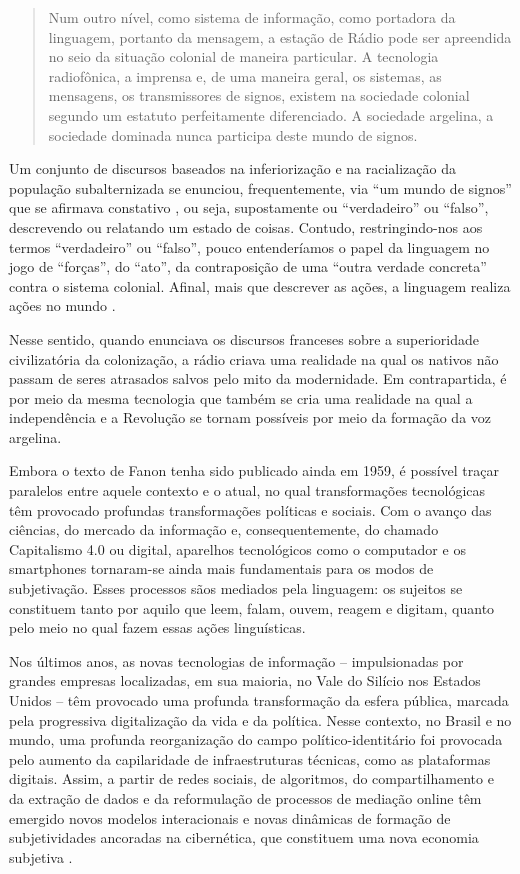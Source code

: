\documentclass[portuguese]{textolivre}
\begin{document}
\begin{quote}
    Num outro nível, como sistema de informação, como portadora da linguagem, portanto da mensagem, a estação de Rádio pode ser apreendida no seio da situação colonial de maneira particular. A tecnologia radiofônica, a imprensa e, de uma maneira geral, os sistemas, as mensagens, os transmissores de signos, existem na sociedade colonial segundo um estatuto perfeitamente diferenciado. A sociedade argelina, a sociedade dominada nunca participa deste mundo de signos.
\end{quote}

Um conjunto de discursos baseados na inferiorização e na racialização da população subalternizada se enunciou, frequentemente, via “um mundo de signos” que se afirmava constativo \cite{austin1962how}, ou seja, supostamente ou “verdadeiro” ou “falso”, descrevendo ou relatando um estado de coisas. Contudo, restringindo-nos aos termos “verdadeiro” ou “falso”, pouco entenderíamos o papel da linguagem no jogo de “forças”, do “ato”, da contraposição de uma “outra verdade concreta” contra o sistema colonial. Afinal, mais que descrever as ações, a linguagem realiza ações no mundo \cite[p. 6]{austin1962how}.

Nesse sentido, quando enunciava os discursos franceses sobre a superioridade civilizatória da colonização, a rádio criava uma realidade na qual os nativos não passam de seres atrasados salvos pelo mito da modernidade. Em contrapartida, é por meio da mesma tecnologia que também se cria uma realidade na qual a independência e a Revolução se tornam possíveis por meio da formação da voz argelina.

Embora o texto de Fanon tenha sido publicado ainda em 1959, é possível traçar paralelos entre aquele contexto e o atual, no qual transformações tecnológicas têm provocado profundas transformações políticas e sociais. Com o avanço das ciências, do mercado da informação e, consequentemente, do chamado Capitalismo 4.0 ou digital, aparelhos tecnológicos como o computador e os smartphones tornaram-se ainda mais fundamentais para os modos de subjetivação. Esses processos sãos mediados pela linguagem: os sujeitos se constituem tanto por aquilo que leem, falam, ouvem, reagem e digitam, quanto pelo meio no qual fazem essas ações linguísticas.

Nos últimos anos, as novas tecnologias de informação – impulsionadas por grandes empresas localizadas, em sua maioria, no Vale do Silício nos Estados Unidos – têm provocado uma profunda transformação da esfera pública, marcada pela progressiva digitalização da vida e da política. Nesse contexto, no Brasil e no mundo, uma profunda reorganização do campo político-identitário foi provocada pelo aumento da capilaridade de infraestruturas técnicas, como as plataformas digitais. Assim, a partir de redes sociais, de algoritmos, do compartilhamento e da extração de dados e da reformulação de processos de mediação online têm emergido novos modelos interacionais \cite{pinto2024novaordem} e novas dinâmicas de formação de subjetividades ancoradas na cibernética, que constituem uma nova economia subjetiva \cite{cesarino2022b}.
\end{document}

